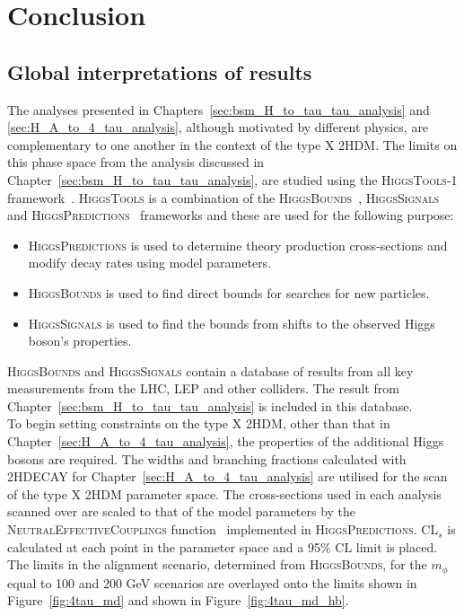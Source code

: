 \chapter{Conclusion}
\label{sec:conclusion}

\section{Global interpretations of results}

The analyses presented in Chapters~\ref{sec:bsm_H_to_tau_tau_analysis} and \ref{sec:H_A_to_4_tau_analysis}, although motivated by different physics, are complementary to one another in the context of the type X \ac{2HDM}.
The limits on this phase space from the analysis discussed in Chapter~\ref{sec:bsm_H_to_tau_tau_analysis}, are studied using the \textsc{HiggsTools-1} framework~\cite{Bahl:2022igd}.
\textsc{HiggsTools} is a combination of the \textsc{HiggsBounds}~\cite{Bechtle:2020pkv}, \textsc{HiggsSignals}~\cite{Bechtle:2020uwn} and \textsc{HiggsPredictions}~\cite{Bahl:2022igd} frameworks and these are used for the following purpose:

\begin{itemize}
\item \textsc{HiggsPredictions} is used to determine theory production cross-sections and modify decay rates using model parameters.
\item \textsc{HiggsBounds} is used to find direct bounds for searches for new particles.
\item \textsc{HiggsSignals} is used to find the bounds from shifts to the observed Higgs boson's properties.
\end{itemize}

\textsc{HiggsBounds} and \textsc{HiggsSignals} contain a database of results from all key measurements from the \ac{LHC}, \ac{LEP} and other colliders.
The result from Chapter~\ref{sec:bsm_H_to_tau_tau_analysis} is included in this database. \\

To begin setting constraints on the type X \ac{2HDM}, other than that in Chapter~\ref{sec:H_A_to_4_tau_analysis}, the properties of the additional Higgs bosons are required.
The widths and branching fractions calculated with \textsc{2HDECAY} for Chapter~\ref{sec:H_A_to_4_tau_analysis} are utilised for the scan of the type X 2HDM parameter space.
The cross-sections used in each analysis scanned over are scaled to that of the model parameters by the \textsc{NeutralEffectiveCouplings} function~\cite{Bechtle:2020pkv} implemented in \textsc{HiggsPredictions}.
CL$_s$ is calculated at each point in the parameter space and a 95\% \ac{CL} limit is placed.
The limits in the alignment scenario, determined from \textsc{HiggsBounds}, for the $m_{\phi}$ equal to 100 and 200 GeV scenarios are overlayed onto the limits shown in Figure~\ref{fig:4tau_md} and shown in Figure~\ref{fig:4tau_md_hb}. \\

